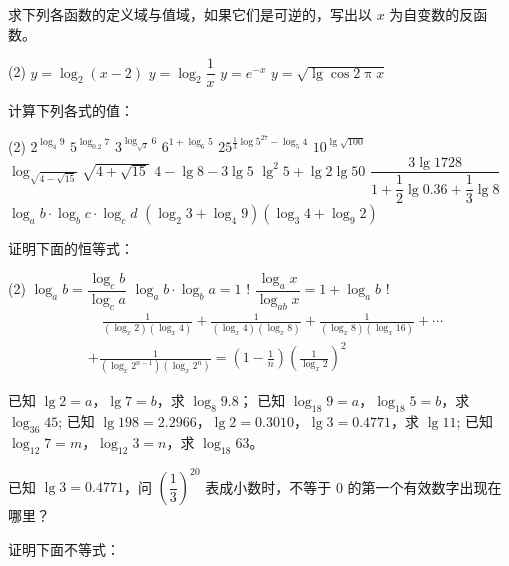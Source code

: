 \begin{Exercise}
\begin{question}
  \item 求下列各函数的定义域与值域，如果它们是可逆的，写出以 $x$ 为自变数的反函数。
  \begin{tasks}(2)
    \task $y=\log_2(x-2)$
    \task $y=\log_2\dfrac{1}{x}$
    \task $y=e^{-x}$
    \task $y=\sqrt{\lg\cos2\uppi x}$
  \end{tasks}
  \item 计算下列各式的值：
  \begin{tasks}(2)
    \task $2^{\log_4 9}$
    \task $5^{\log_{0.2} 7}$
    \task $3^{\log_{\sqrt{2}}6}$
    \task $6^{1+\log_6 5}$
    \task $25^{\tfrac{1}{3} \log 5^{27}-\log_{5} 4}$
    \task $10^{\lg\sqrt{100}}$
    \task $\log _{\sqrt{4-\sqrt{15}}} \sqrt{4+\sqrt{15}}$
    \task $4-\lg 8-3 \lg 5$
    \task $ \lg ^{2} 5+\lg 2 \lg 50$
    \task $\dfrac{3 \lg 1728}{1+\dfrac{1}{2} \lg 0.36+\dfrac{1}{3} \lg 8}$
    \task $\log _{a} b \cdot \log _{b} c \cdot \log _{c} d$
    \task $\left(\log _{2} 3+\log _{4} 9\right)\left(\log _{3} 4+\log _{9} 2\right)$
  \end{tasks}
  \item 证明下面的恒等式：
  \begin{tasks}(2)
    \task $\log_a b=\dfrac{\log_c b}{\log_c a}$
    \task $\log_a b\cdot \log_b a=1$
    \task! $\dfrac{\log_a x}{\log_{ab} x}=1+\log_a b$  
    \task! \[\begin{split}
      &\quad \frac{1}{(\log_x 2)(\log_x 4)}+   \frac{1}{(\log_x 4)(\log_x 8)}+   \frac{1}{(\log_x 8)(\log_x 16)}+\cdots \\
      &+   \frac{1}{(\log_x 2^{n-1})(\log_x 2^n)}=\left(1-\frac{1}{n}\right)\left(\frac{1}{\log_x 2}\right)^2
    \end{split}\]
  \end{tasks}
  \item 
  \begin{tasks}
    \task 已知 $\lg2=a$，$\lg7=b$，求 $\log_8 9.8$；
    \task 已知 $\log_{18}9=a$，$\log_{18}5=b$，求 $\log_{36}45$;
    \task 已知 $\lg198=2.2966$，$\lg2=0.3010$，$\lg3=0.4771$，求 $\lg 11$;
    \task 已知 $\log_{12}7=m$，$\log_{12}3=n$，求 $\log_{18}63$。
  \end{tasks} 
  \item 已知 $\lg3=0.4771$，问 $\left(\dfrac{1}{3}\right)^{20}$ 表成小数时，不等于 0 的第一个有效数字出现在哪里？
  \item 证明下面不等式：
  \begin{tasks}

\end{tasks}
\end{question}
\end{Exercise}
